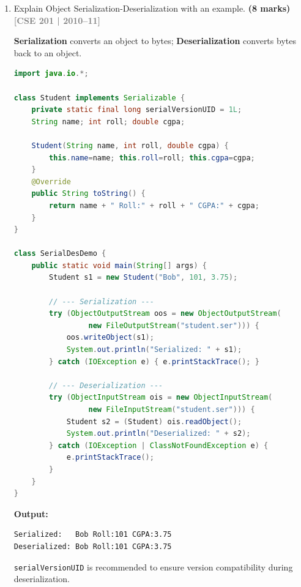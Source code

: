 \documentclass[12pt,a3paper]{article}
\newcommand{\yr}[1]{\hfill\textcolor{gray}{\small\textbf{[#1]}}}
\newcommand{\mk}[1]{\textcolor{orange!70!black}{\small\textbf{(#1 marks)}}}
\begin{document}
\begin{enumerate}
\begin{tcolorbox}
\begin{lstlisting}[language=Java]
        for (Record r : records)
            System.out.println(r);
    }
}
\end{lstlisting}
\end{tcolorbox}

\item Explain Object Serialization-Deserialization with an example. \mk{8}
\yr{CSE 201 | 2010--11}

\begin{tcolorbox}[enhanced,breakable,ansbox,
  colback=cA!4,colframe=cA,boxrule=0.8pt,arc=5pt,
  title={\textbf{Answer --- Object Serialization-Deserialization Example}},
  fonttitle=\bfseries\color{white},colbacktitle=cA]

\textbf{Serialization} converts an object to bytes;
\textbf{Deserialization} converts bytes back to an object.

\begin{lstlisting}[language=Java]
import java.io.*;

class Student implements Serializable {
    private static final long serialVersionUID = 1L;
    String name; int roll; double cgpa;

    Student(String name, int roll, double cgpa) {
        this.name=name; this.roll=roll; this.cgpa=cgpa;
    }
    @Override
    public String toString() {
        return name + " Roll:" + roll + " CGPA:" + cgpa;
    }
}

class SerialDesDemo {
    public static void main(String[] args) {
        Student s1 = new Student("Bob", 101, 3.75);

        // --- Serialization ---
        try (ObjectOutputStream oos = new ObjectOutputStream(
                 new FileOutputStream("student.ser"))) {
            oos.writeObject(s1);
            System.out.println("Serialized: " + s1);
        } catch (IOException e) { e.printStackTrace(); }

        // --- Deserialization ---
        try (ObjectInputStream ois = new ObjectInputStream(
                 new FileInputStream("student.ser"))) {
            Student s2 = (Student) ois.readObject();
            System.out.println("Deserialized: " + s2);
        } catch (IOException | ClassNotFoundException e) {
            e.printStackTrace();
        }
    }
}
\end{lstlisting}
\textbf{Output:}
\begin{verbatim}
Serialized:   Bob Roll:101 CGPA:3.75
Deserialized: Bob Roll:101 CGPA:3.75
\end{verbatim}
\texttt{serialVersionUID} is recommended to ensure version
compatibility during deserialization.
\end{tcolorbox}


\end{enumerate}
\end{document}
